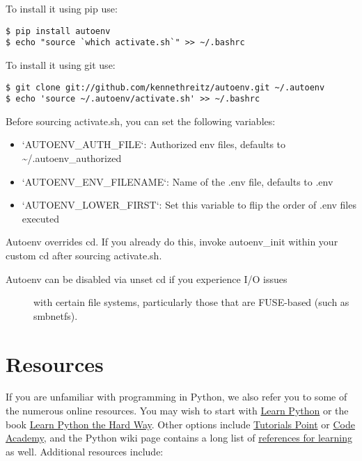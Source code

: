 To install it using pip use:

\begin{verbatim}
$ pip install autoenv
$ echo "source `which activate.sh`" >> ~/.bashrc
\end{verbatim}

To install it using git use:

\begin{verbatim}
$ git clone git://github.com/kennethreitz/autoenv.git ~/.autoenv
$ echo 'source ~/.autoenv/activate.sh' >> ~/.bashrc
\end{verbatim}

Before sourcing activate.sh, you can set the following variables:

\begin{itemize}
\tightlist
\item
  `AUTOENV\_AUTH\_FILE`: Authorized env files, defaults to
  \textasciitilde{}/.autoenv\_authorized
\item
  `AUTOENV\_ENV\_FILENAME`: Name of the .env file, defaults to .env
\item
  `AUTOENV\_LOWER\_FIRST`: Set this variable to flip the order of .env
  files executed
\end{itemize}

Autoenv overrides cd. If you already do this, invoke autoenv\_init
within your custom cd after sourcing activate.sh.

\begin{description}
\item[Autoenv can be disabled via unset cd if you experience I/O issues]
with certain file systems, particularly those that are FUSE-based (such
as smbnetfs).
\end{description}

\section{Resources}\label{resources}

If you are unfamiliar with programming in Python, we also refer you to
some of the numerous online resources. You may wish to start with
\href{https://www.learnpython.org}{Learn Python} or the book
\href{http://learnpythonthehardway.org/book/}{Learn Python the Hard
Way}. Other options include
\href{http://www.tutorialspoint.com/python/}{Tutorials Point} or
\href{http://www.codecademy.com/en/tracks/python}{Code Academy}, and the
Python wiki page contains a long list of
\href{https://wiki.python.org/moin/BeginnersGuide/Programmers}{references
for learning} as well. Additional resources include:

